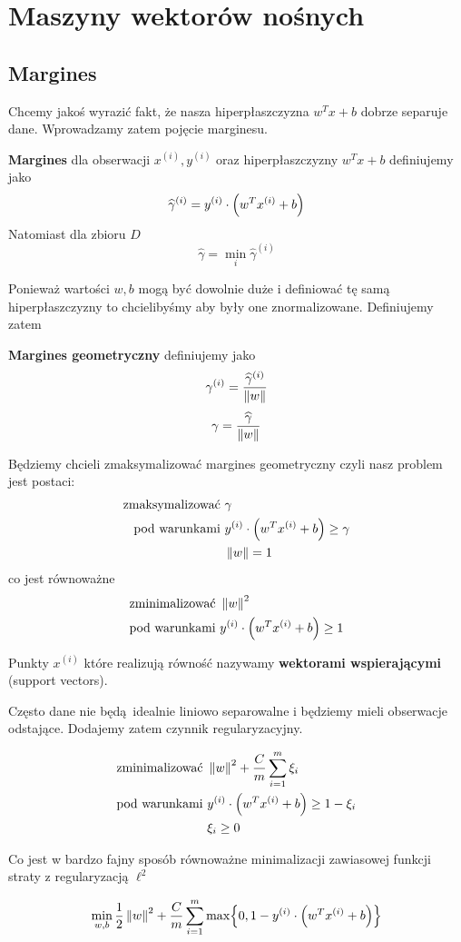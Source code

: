 \section{Maszyny wektorów nośnych}

\subsection{Margines}

Chcemy jakoś wyrazić fakt, że nasza hiperpłaszczyzna \( w^Tx + b \) dobrze separuje dane.
Wprowadzamy zatem pojęcie marginesu.

\begin{definition}
    \textbf{Margines} dla obserwacji \( x^{(i)}, y^{(i)} \) oraz hiperpłaszczyzny \( w^Tx + b\) definiujemy jako
    \[
        \widehat \gamma^{(i)} = y^{(i)} \cdot \left(w^T x^{(i)} + b\right)
    \]
    Natomiast dla zbioru \( D \)
    \[
        \widehat \gamma = \min_i \widehat \gamma^{(i)}
    \]
\end{definition}

Ponieważ wartości \( w, b \) mogą być dowolnie duże i definiować tę samą hiperpłaszczyzny to chcielibyśmy aby były one znormalizowane.
Definiujemy zatem
\begin{definition}
    \textbf{Margines geometryczny} definiujemy jako
    \[
        \gamma^{(i)} = \frac{\widehat \gamma^{(i)}}{\left\Vert w \right\Vert}
    \]
    \[
        \gamma = \frac{\widehat \gamma}{\left\Vert w \right\Vert}
    \]
\end{definition}

Będziemy chcieli zmaksymalizować margines geometryczny czyli nasz problem jest postaci:
\begin{align*}
    \text{zmaksymalizować } & \gamma \\
    \text{pod warunkami } & y^{(i)} \cdot \left(w^T x^{(i)} + b\right) \geq \gamma \\
    & \left\Vert w \right\Vert = 1
\end{align*}
co jest równoważne
\begin{align*}
    \text{zminimalizować } & \left\Vert w \right\Vert^2 \\
    \text{pod warunkami } & y^{(i)} \cdot \left(w^T x^{(i)} + b\right) \geq 1 \\
\end{align*}

Punkty \( x^{(i)} \) które realizują równość nazywamy \textbf{wektorami wspierającymi} (support vectors).

Często dane nie będą idealnie liniowo separowalne i będziemy mieli obserwacje odstające.
Dodajemy zatem czynnik regularyzacyjny.

\begin{align*}
    \text{zminimalizować } & \left\Vert w \right\Vert^2 + \frac{C}{m} \sum_{i=1}^m \xi_i \\
    \text{pod warunkami } & y^{(i)} \cdot \left(w^T x^{(i)} + b\right) \geq 1 - \xi_i \\
        & \xi_i \geq 0
\end{align*}

Co jest w bardzo fajny sposób równoważne minimalizacji zawiasowej funkcji straty z regularyzacją \( \ell^2 \)

\[
    \min_{w, b} \frac{1}{2} \norm{w}^2 + \frac{C}{m}\sum_{i=1}^m \max\braces{0, 1 - y^{(i)} \cdot \pars{w^T x^{(i)} + b}}
\]
